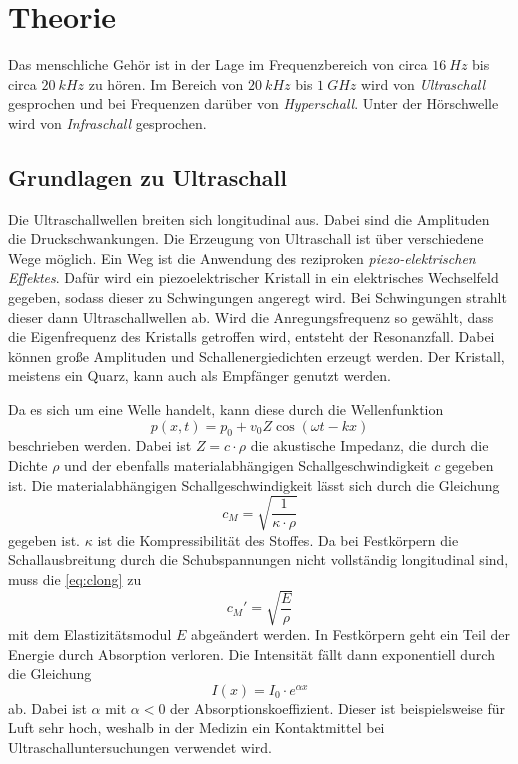 \section{Theorie}
\label{sec:Theorie}

Das menschliche Gehör ist in der Lage im Frequenzbereich von circa $\qty{16}{Hz}$ bis circa $\qty{20}{kHz}$ zu hören.
Im Bereich von $\qty{20}{kHz}$ bis $\qty{1}{GHz}$ wird von \textit{Ultraschall} gesprochen und bei Frequenzen darüber von \textit{Hyperschall}.
Unter der Hörschwelle wird von \textit{Infraschall} gesprochen.


\subsection{Grundlagen zu Ultraschall}

Die Ultraschallwellen breiten sich longitudinal aus.
Dabei sind die Amplituden die Druckschwankungen. 
Die Erzeugung von Ultraschall ist über verschiedene Wege möglich.
Ein Weg ist die Anwendung des reziproken \textit{piezo-elektrischen Effektes}.
Dafür wird ein piezoelektrischer Kristall in ein elektrisches Wechselfeld gegeben, sodass dieser zu Schwingungen angeregt wird.
Bei Schwingungen strahlt dieser dann Ultraschallwellen ab.
Wird die Anregungsfrequenz so gewählt, dass die Eigenfrequenz des Kristalls getroffen wird, entsteht der Resonanzfall.
Dabei können große Amplituden und Schallenergiedichten erzeugt werden.
Der Kristall, meistens ein Quarz, kann auch als Empfänger genutzt werden.

Da es sich um eine Welle handelt, kann diese durch die Wellenfunktion
\begin{equation}
    p(x, t) = p_0 + v_0 Z \cos (\omega t - k x)
\end{equation}
beschrieben werden. Dabei ist $Z = c \cdot \rho$ die akustische Impedanz, die durch die Dichte $\rho$
und der ebenfalls materialabhängigen Schallgeschwindigkeit $c$ gegeben ist.
Die materialabhängigen Schallgeschwindigkeit lässt sich durch die Gleichung
\begin{equation} \label{eq:clong}
    c_M = \sqrt{\frac{1}{\kappa \cdot \rho}}
\end{equation}
gegeben ist. $\kappa$ ist die Kompressibilität des Stoffes.
Da bei Festkörpern die Schallausbreitung durch die Schubspannungen nicht vollständig longitudinal sind, muss die \autoref{eq:clong} zu
\begin{equation}
    c_M ' = \sqrt{\frac{E}{\rho}}
\end{equation}
mit dem Elastizitätsmodul $E$ abgeändert werden.
In Festkörpern geht ein Teil der Energie durch Absorption verloren.
Die Intensität fällt dann exponentiell durch die Gleichung
\begin{equation} \label{eq:Intensität}
    I(x) = I_0 \cdot e^{\alpha x}
\end{equation}
ab. Dabei ist $\alpha$ mit $\alpha < 0$ der Absorptionskoeffizient.
Dieser ist beispielsweise für Luft sehr hoch, weshalb in der Medizin ein Kontaktmittel bei Ultraschalluntersuchungen verwendet wird. \\

